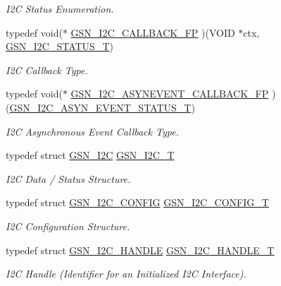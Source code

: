 \begin{DoxyCompactItemize}
\begin{DoxyCompactList}\small\item\em I2C Status Enumeration. \end{DoxyCompactList}\item 
typedef void($\ast$ \hyperlink{a00649_gac8a6faecb999f4f891344abbbfc08914}{GSN\_\-I2C\_\-CALLBACK\_\-FP} )(VOID $\ast$ctx, \hyperlink{a00649_ga9787fba32c156c866916dc301e5727c8}{GSN\_\-I2C\_\-STATUS\_\-T})
\begin{DoxyCompactList}\small\item\em I2C Callback Type. \end{DoxyCompactList}\item 
typedef void($\ast$ \hyperlink{a00649_gab1a00d4a51461218cbbafc33b29ddd89}{GSN\_\-I2C\_\-ASYNEVENT\_\-CALLBACK\_\-FP} )(\hyperlink{a00649_ga4a73cb21823d744414fed4d0aef5eb3c}{GSN\_\-I2C\_\-ASYN\_\-EVENT\_\-STATUS\_\-T})
\begin{DoxyCompactList}\small\item\em I2C Asynchronous Event Callback Type. \end{DoxyCompactList}\item 
typedef struct \hyperlink{a00098}{GSN\_\-I2C} \hyperlink{a00649_gae64c71a450a11f2589a7e359f15fca3a}{GSN\_\-I2C\_\-T}
\begin{DoxyCompactList}\small\item\em I2C Data / Status Structure. \end{DoxyCompactList}\item 
typedef struct \hyperlink{a00099}{GSN\_\-I2C\_\-CONFIG} \hyperlink{a00649_ga851303f2738862fc0d0f1ea157265fec}{GSN\_\-I2C\_\-CONFIG\_\-T}
\begin{DoxyCompactList}\small\item\em I2C Configuration Structure. \end{DoxyCompactList}\item 
typedef struct \hyperlink{a00100}{GSN\_\-I2C\_\-HANDLE} \hyperlink{a00649_ga0a305c61b3066326aa4867e75fdfdbf1}{GSN\_\-I2C\_\-HANDLE\_\-T}
\begin{DoxyCompactList}\small\item\em I2C Handle (Identifier for an Initialized I2C Interface). \end{DoxyCompactList}\end{DoxyCompactItemize}
